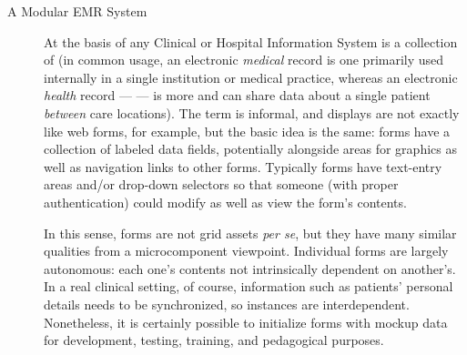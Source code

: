 \documentclass[11pt]{article}
\begin{document}
{
  


\vspace*{4pt}
\enlargethispage{4pt}

\begin{description}

\item[A Modular EMR System]  At the basis of any Clinical or Hospital Information 
System is a collection of \EMR{}  (in common usage, an 
electronic \textit{medical} record is one primarily used internally 
in a single institution or medical practice, whereas an electronic 
\textit{health} record --- \EHR{} --- is more  
and can share data about a single patient \textit{between} care 
locations).  The term  is informal, and \EMR{} displays 
are not exactly like web forms, for example, but the 
basic idea is the same: forms have a collection of labeled 
data fields, potentially alongside areas for graphics as well 
as navigation links to other forms.  Typically forms have 
text-entry areas and/or drop-down selectors so that 
someone (with proper authentication) could modify as well as 
view the form's contents.

\pseudoIndent{} In this sense, \GUI{} forms are not grid assets \textit{per se}, 
but they have many similar qualities from a microcomponent 
viewpoint.  Individual forms are largely autonomous: each 
one's contents not intrinsically dependent on another's.  
In a real clinical setting, of course, information such as 
patients' personal details needs to be synchronized, so \EMR{} instances  
are interdependent.  Nonetheless, it is certainly possible to initialize forms 
with mockup data for development, testing, training, and pedagogical purposes.


\end{description}}
\end{document}
